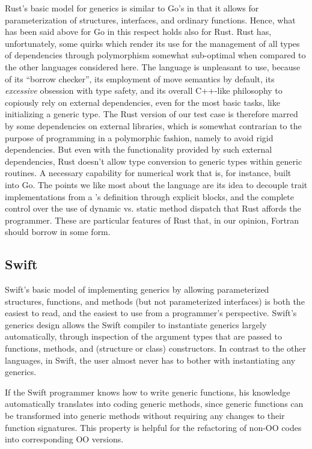 \documentclass[11pt,oneside]{report}
\newcommand{\code}[1]{{\selectfont\ttfamily{#1}}}
\begin{document}
Rust's basic model for generics is similar to Go's in that it allows
for parameterization of structures, interfaces, and ordinary
functions. Hence, what has been said above for Go in this respect
holds also for Rust. Rust has, unfortunately, some quirks which render
its use for the management of all types of dependencies through
polymorphism somewhat sub-optimal when compared to the other languages
considered here. The language is unpleasant to use, because of its
``borrow checker'', its employment of move semantics by default, its
\emph{excessive} obsession with type safety, and its overall C++-like
philosophy to copiously rely on external dependencies, even for the
most basic tasks, like initializing a generic type. The Rust version
of our test case is therefore marred by some dependencies on external
libraries, which is somewhat contrarian to the purpose of programming
in a polymorphic fashion, namely to avoid rigid dependencies. But even
with the functionality provided by such external dependencies, Rust
doesn't allow type conversion to generic types within generic
routines. A necessary capability for numerical work that is, for
instance, built into Go. The points we like most about the language
are its idea to decouple trait implementations from a \code{struct}'s
definition through explicit \code{impl} blocks, and the complete
control over the use of dynamic vs. static method dispatch that Rust
affords the programmer. These are particular features of Rust that, in
our opinion, Fortran should borrow in some form.

\subsection{Swift}

Swift's basic model of implementing generics by allowing parameterized
structures, functions, and methods (but not parameterized interfaces)
is both the easiest to read, and the easiest to use from a
programmer's perspective. Swift's generics design allows the Swift
compiler to instantiate generics largely automatically, through
inspection of the argument types that are passed to functions,
methods, and (structure or class) constructors. In contrast to the
other languages, in Swift, the user almost never has to bother with
instantiating any generics.

If the Swift programmer knows how to write generic functions, his
knowledge automatically translates into coding generic methods, since
generic functions can be transformed into generic methods without
requiring any changes to their function signatures. This property is
helpful for the refactoring of non-OO codes into corresponding OO
versions.
\end{document}
